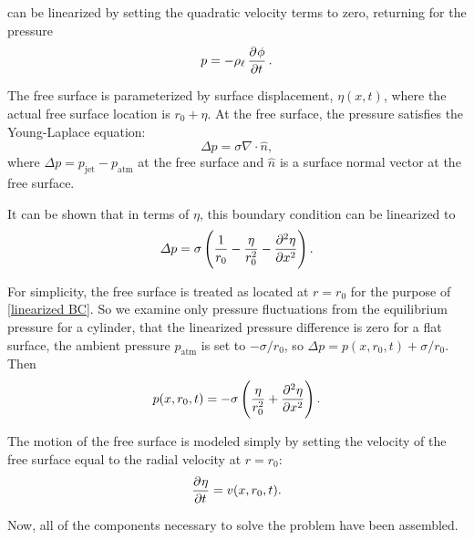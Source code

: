 can be linearized by setting the quadratic velocity terms to zero, returning for the pressure
\begin{equation}
   p = -\rhol \dpd{\phi}{t}. \label{eqn:unsteady Bernoulli linearized}
\end{equation}

The free surface is parameterized by surface displacement, $\eta(x, t)$, where the actual free surface location is $r_0 + \eta$. At the free surface, the pressure satisfies the Young-Laplace equation:
\begin{equation}
   \Delta p = \sigma \nabla \cdot \hat{n}, \label{eqn:exact BC}
\end{equation}
where $\Delta p = p_\text{jet} - p_\text{atm}$ at the free surface and $\hat{n}$ is a surface normal vector at the free surface.

It can be shown that in terms of $\eta$, this boundary condition can be linearized to~\citep[p.~975]{berger_initial-value_1988}
\begin{equation}
   \Delta p = \sigma \left(\frac{1}{r_0} - \frac{\eta}{r_0^2} - \dpd[2]{\eta}{x}\right). \label{eqn:linearized BC}
\end{equation}

For simplicity, the free surface is treated as located at $r = r_0$ for the purpose of \eqref{linearized BC}. So we examine only pressure fluctuations from the equilibrium pressure for a cylinder, that the linearized pressure difference is zero for a flat surface, the ambient pressure $p_\text{atm}$ is set to $-\sigma/r_0$, so $\Delta p = p(x, r_0, t) + \sigma/r_0$. Then
\begin{equation}
   p(x, r_0, t) = -\sigma \left(\frac{\eta}{r_0^2} + \dpd[2]{\eta}{x}\right). \label{eqn:linearized BC simplified}
\end{equation}

The motion of the free surface is modeled simply by setting the velocity of the free surface equal to the radial velocity at $r = r_0$:
\begin{equation}
   \dpd{\eta}{t} = v(x, r_0, t). \label{eqn:surface displacement evolution}
\end{equation}

Now, all of the components necessary to solve the problem have been assembled.

